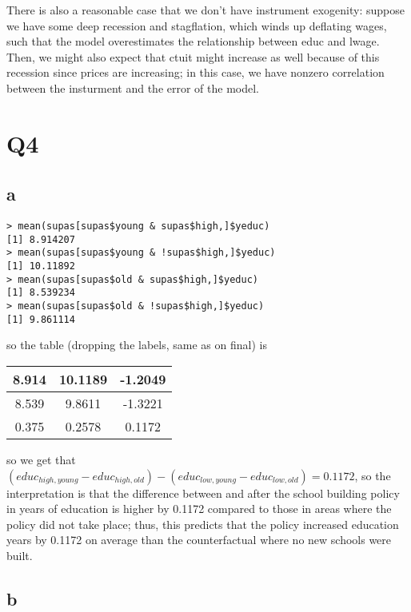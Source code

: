 \documentclass[12pt,letterpaper]{article}
\theoremstyle{definition}
\begin{document}
There is also a reasonable case that we don't have instrument exogenity: suppose we have some deep recession and stagflation, which winds up deflating wages, such that the model overestimates the relationship between educ and lwage. Then, we might also expect that ctuit might increase as well because of this recession since prices are increasing; in this case, we have nonzero correlation between the insturment and the error of the model.

\section*{Q4}
\subsection*{a}

\begin{Verbatim}[fontsize=\small]
> mean(supas[supas$young & supas$high,]$yeduc)
[1] 8.914207
> mean(supas[supas$young & !supas$high,]$yeduc)
[1] 10.11892
> mean(supas[supas$old & supas$high,]$yeduc)
[1] 8.539234
> mean(supas[supas$old & !supas$high,]$yeduc)
[1] 9.861114
\end{Verbatim}
so the table (dropping the labels, same as on final) is
\begin{center}
  \begin{tabular}{c|c|c}
    8.914 & 10.1189 & -1.2049 \\ \hline
    8.539 & 9.8611 & -1.3221 \\ \hline
    0.375 & 0.2578 & 0.1172
  \end{tabular}
\end{center}
so we get that $(educ_{high,young} - educ_{high,old}) - (educ_{low,young} - educ_{low,old}) = 0.1172$, so the interpretation is that the difference between and after the school building policy in years of education is higher by 0.1172 compared to those in areas where the policy did not take place; thus, this predicts that the policy increased education years by 0.1172 on average than the counterfactual where no new schools were built.

\subsection*{b}
\end{document}
